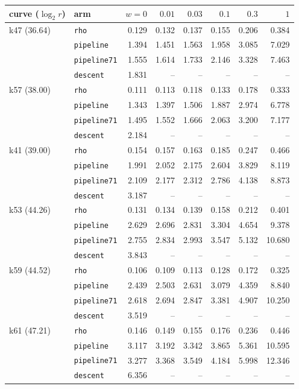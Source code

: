 \begin{tabular}{@{}llrrrrrr@{}}
\toprule
curve ($\log_2r$) & arm & $w=0$ & $0.01$ & $0.03$ & $0.1$ & $0.3$ & $1$ \\
\midrule
k47 (36.64) & \texttt{rho} & 0.129 & 0.132 & 0.137 & 0.155 & 0.206 & 0.384 \\
 & \texttt{pipeline} & 1.394 & 1.451 & 1.563 & 1.958 & 3.085 & 7.029 \\
 & \texttt{pipeline71} & 1.555 & 1.614 & 1.733 & 2.146 & 3.328 & 7.463 \\
 & \texttt{descent} & 1.831 & -- & -- & -- & -- & -- \\
\addlinespace
k57 (38.00) & \texttt{rho} & 0.111 & 0.113 & 0.118 & 0.133 & 0.178 & 0.333 \\
 & \texttt{pipeline} & 1.343 & 1.397 & 1.506 & 1.887 & 2.974 & 6.778 \\
 & \texttt{pipeline71} & 1.495 & 1.552 & 1.666 & 2.063 & 3.200 & 7.177 \\
 & \texttt{descent} & 2.184 & -- & -- & -- & -- & -- \\
\addlinespace
k41 (39.00) & \texttt{rho} & 0.154 & 0.157 & 0.163 & 0.185 & 0.247 & 0.466 \\
 & \texttt{pipeline} & 1.991 & 2.052 & 2.175 & 2.604 & 3.829 & 8.119 \\
 & \texttt{pipeline71} & 2.109 & 2.177 & 2.312 & 2.786 & 4.138 & 8.873 \\
 & \texttt{descent} & 3.187 & -- & -- & -- & -- & -- \\
\addlinespace
k53 (44.26) & \texttt{rho} & 0.131 & 0.134 & 0.139 & 0.158 & 0.212 & 0.401 \\
 & \texttt{pipeline} & 2.629 & 2.696 & 2.831 & 3.304 & 4.654 & 9.378 \\
 & \texttt{pipeline71} & 2.755 & 2.834 & 2.993 & 3.547 & 5.132 & 10.680 \\
 & \texttt{descent} & 3.843 & -- & -- & -- & -- & -- \\
\addlinespace
k59 (44.52) & \texttt{rho} & 0.106 & 0.109 & 0.113 & 0.128 & 0.172 & 0.325 \\
 & \texttt{pipeline} & 2.439 & 2.503 & 2.631 & 3.079 & 4.359 & 8.840 \\
 & \texttt{pipeline71} & 2.618 & 2.694 & 2.847 & 3.381 & 4.907 & 10.250 \\
 & \texttt{descent} & 3.519 & -- & -- & -- & -- & -- \\
\addlinespace
k61 (47.21) & \texttt{rho} & 0.146 & 0.149 & 0.155 & 0.176 & 0.236 & 0.446 \\
 & \texttt{pipeline} & 3.117 & 3.192 & 3.342 & 3.865 & 5.361 & 10.595 \\
 & \texttt{pipeline71} & 3.277 & 3.368 & 3.549 & 4.184 & 5.998 & 12.346 \\
 & \texttt{descent} & 6.356 & -- & -- & -- & -- & -- \\
\bottomrule
\end{tabular}
